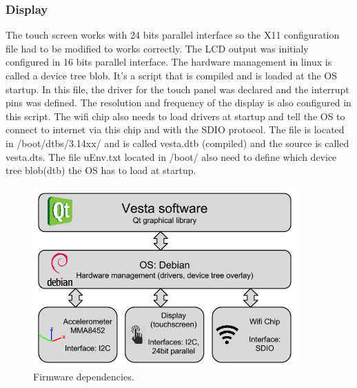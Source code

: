 \subsubsection{Display}
The touch screen works with 24 bits parallel interface so the X11 configuration file had to be modified to works correctly. The LCD output was initialy configured in 16 bits parallel interface.
The hardware management in linux is called a device tree blob. It’s a script that is compiled and is loaded at the OS startup. In this file, the driver for the touch panel was declared and the interrupt pins was defined. The resolution and frequency of the display is also configured in this script. The wifi chip also needs to load drivers at startup and tell the OS to connect to internet via this chip and with the SDIO protocol.
The file is located in /boot/dtbs/3.14xx/ and is called vesta.dtb (compiled) and the source is called vesta.dts. The file uEnv.txt located in /boot/ also need to define which device tree blob(dtb) the OS has to load at startup.
\begin{figure}[!htb]
    \centering
    \includegraphics[width=0.9\textwidth,keepaspectratio]{chap/softFig/first_diagram2}
    \caption{Firmware dependencies.}
    \label{fig:firmware dependencies}
\end{figure}

